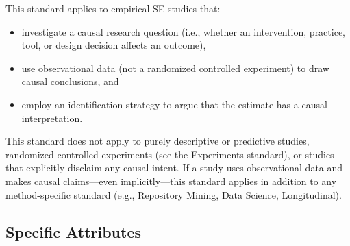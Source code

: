This standard applies to empirical SE studies that:
\begin{itemize}[leftmargin=15pt]
    \item investigate a causal research question (i.e., whether an intervention, practice, tool, or design decision affects an outcome),
    \item use observational data (not a randomized controlled experiment) to draw causal conclusions, and
    \item employ an identification strategy to argue that the estimate has a causal interpretation.
\end{itemize}
This standard does not apply to purely descriptive or predictive studies, randomized controlled experiments (see the Experiments standard), or studies that explicitly disclaim any causal intent.
If a study uses observational data and makes causal claims---even implicitly---this standard applies in addition to any method-specific standard (e.g., Repository Mining, Data Science, Longitudinal).

\subsection{Specific Attributes}

